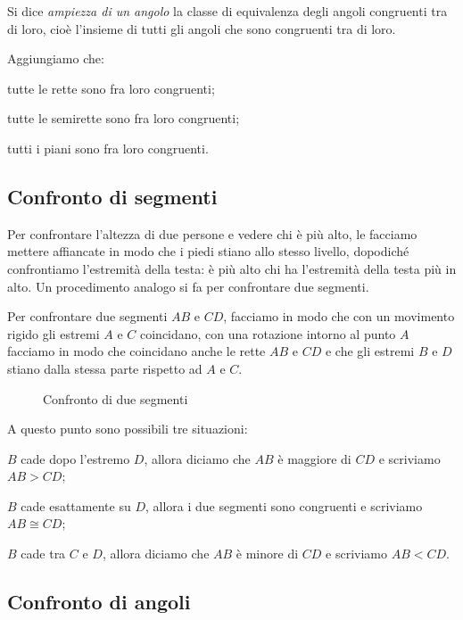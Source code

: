 \begin{definizione}
Si dice \emph{ampiezza di un angolo} la classe di equivalenza degli angoli congruenti tra di loro, cioè l'insieme di tutti gli angoli che sono congruenti tra di loro.
\end{definizione}

Aggiungiamo che:
\begin{itemize*}
\item tutte le rette sono fra loro congruenti;
\item tutte le semirette sono fra loro congruenti;
\item tutti i piani sono fra loro congruenti.
\end{itemize*}

\subsection{Confronto di segmenti}

Per confrontare l'altezza di due persone e vedere chi è più alto, le facciamo mettere affiancate in modo che i piedi stiano allo stesso livello, dopodiché confrontiamo l'estremità della testa: è più alto chi ha l'estremità della testa più in alto. Un procedimento analogo si fa per confrontare due segmenti.

Per confrontare due segmenti $AB$ e $CD$, facciamo in modo che con un movimento rigido gli estremi $A$ e $C$ coincidano, con una rotazione intorno al punto $A$ facciamo in  modo che coincidano anche le rette $AB$ e $CD$ e che gli estremi $B$ e $D$ stiano dalla stessa parte rispetto ad $A$ e $C$.

\begin{figure}[htb]
\centering
\caption{Confronto di due segmenti}
\end{figure}

A questo punto sono possibili tre situazioni:
\begin{itemize*}
\item $B$ cade dopo l'estremo $D$, allora diciamo che $AB$ è maggiore di $CD$ e scriviamo $AB>CD$;
\item $B$ cade esattamente su $D$, allora i due segmenti sono congruenti e scriviamo $AB\cong CD$;
\item $B$ cade tra $C$ e $D$, allora diciamo che $AB$ è minore di $CD$ e scriviamo $AB<CD$.
\end{itemize*}

\subsection{Confronto di angoli}


